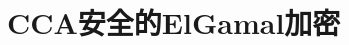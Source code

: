 \section{CCA安全的ElGamal加密}\label{sec:12-4}

\begin{game}\label{game:12-3}
	
\end{game}

\begin{definition}\label{def:12-4}
	
\end{definition}

\begin{remark}[群元素验证]\label{remark:12-1}
	
\end{remark}

\begin{remark}[哈希$(v,w)$ vs. 只哈希 $w$]\label{remark:12-2}
	
\end{remark}

\begin{theorem}\label{theo:12-4}
	
\end{theorem}